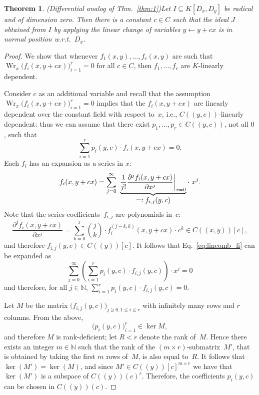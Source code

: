 \documentclass[a4paper,draft]{amsart}
\let\set\mathbb
\def\Wr{\operatorname{Wr}}
\newtheorem{thm}{Theorem}
\begin{document}
\begin{thm} (Differential analog of Thm.~\ref{thm:1})\label{thm:changofvariables}
  Let $I\subseteq K[D_x,D_y]$ be radical and of dimension zero.
  Then there is a constant $c\in C$ such that the ideal $J$ obtained
  from $I$ by applying the linear change of variables $y\leftarrow y+cx$
  is in normal position w.r.t.~$D_x$.
\end{thm}
\begin{proof}
  We show that whenever $f_1(x,y),\dots,f_r(x,y)$ are such that 
  $\Wr_x\bigl(f_i(x,y+cx)\bigr)_{i=1}^r=0$ for all $c\in C$,
  then $f_1,\dots,f_r$ are $K$-linearly dependent.

  Consider $c$ as an additional variable and recall that the
  assumption $\Wr_x\bigl(f_i(x,y+cx)\bigr)_{i=1}^r=0$
  implies that the $f_i(x,y+cx)$ are linearly dependent over the constant
  field with respect to~$x$, i.e., $C((y,c))$-linearly dependent: thus we can
  assume that there exist $p_1,\dots,p_r\in C((y,c))$, not all $0$, such that
  \begin{equation}\label{eq:lincomb_fi}
    \sum_{i=1}^r p_i(y,c)\cdot f_i(x,y+cx) = 0.
  \end{equation}
  Each $f_{i}$ has an expansion as a series in $x$:
  \[
    f_i(x,y+cx) = \sum_{j=0}^\infty \ \underbrace{\frac{1}{j!}
      \frac{\partial^j f_i(x,y+cx)}{\partial x^j}\bigg|_{x=0}}_%
    {\textstyle =: f_{i,j}(y,c)}
    \cdot\ x^j.
  \]
  Note that the series coefficients~$f_{i,j}$ are polynomials in~$c$:
  \[
    \frac{\partial^j f_i(x,y+cx)}{\partial x^j} =
    \sum_{k=0}^j \binom{j}{k} \cdot f_i^{(j-k,k)}(x,y+cx)\cdot c^k
    \in C((x,y))[c],
  \]
  and therefore $f_{i,j}(y,c)\in C((y))[c]$. It follows that Eq.~\eqref{eq:lincomb_fi}
  can be expanded as 
  \[
    \sum_{j=0}^\infty \left(
      \sum_{i=1}^r p_i(y,c) \cdot f_{i,j}(y,c) \right) \cdot x^j = 0
  \]
  and therefore, for all $j \in \set N$, $\sum_{i=1}^r p_i(y,c) \cdot f_{i,j}(y,c)=0$.

  Let $M$ be the matrix $\bigl(f_{i,j}(y,c)\bigr)_{j\geq 0,1\leq i\leq r}$
  with infinitely many rows and $r$ columns.
  From the above, 
  \[
    \bigl(p_i(y,c)\bigr)_{i=1}^r \in \ker M,
  \]
  and therefore $M$ is rank-deficient; let $R<r$ denote the rank of~$M$. Hence
  there exists an integer $m\in\set{N}$ such that the rank of the
  $(m\times r)$-submatrix~$M'$, that is obtained by taking the first $m$ rows
  of~$M$, is also equal to~$R$. It follows that $\ker(M')=\ker(M)$, and since
  $M'\in C((y))[c]^{m\times r}$ we have that $\ker(M')$ is a subspace of
  $C((y))(c)^r$. Therefore, the coefficients $p_i(y,c)$ can be chosen in
  $C((y))(c)$.


\end{proof}
\end{document}
